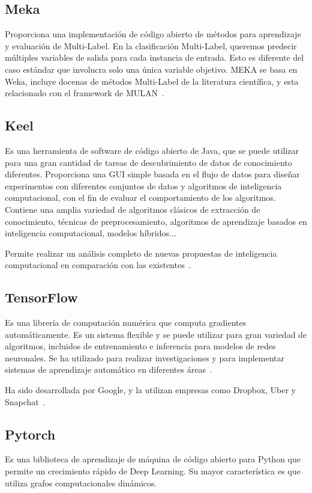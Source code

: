 \subsection{Meka}
Proporciona una implementación de código abierto de métodos para aprendizaje y evaluación de Multi-Label. En la clasificación Multi-Label, queremos predecir múltiples variables de salida para cada instancia de entrada. Esto es diferente del caso estándar que involucra solo una única variable objetivo. MEKA se basa en Weka, incluye docenas de métodos Multi-Label de la literatura científica, y esta relacionado con el framework de MULAN~\cite{meka}.

\subsection{Keel}
Es una herramienta de software de código abierto de Java, que se puede utilizar para una gran cantidad de tareas de descubrimiento de datos de conocimiento diferentes. Proporciona una GUI simple basada en el flujo de datos para diseñar experimentos con diferentes conjuntos de datos y algoritmos de inteligencia computacional, con el fin de evaluar el comportamiento de los algoritmos. Contiene una amplia variedad de algoritmos clásicos de extracción de conocimiento, técnicas de preprocesamiento, algoritmos de aprendizaje basados en inteligencia computacional, modelos híbridos...

Permite realizar un análisis completo de nuevas propuestas de inteligencia computacional en comparación con las existentes~\cite{keel}.

\subsection{TensorFlow}
Es una librería de computación numérica que computa gradientes automáticamente. Es un sistema flexible y se puede utilizar para gran variedad de algoritmos, incluidos de entrenamiento e inferencia para modelos de redes neuronales. Se ha utilizado para realizar investigaciones y para implementar sistemas de aprendizaje automático en diferentes áreas~\cite{tensorflow}.

Ha sido desarrollada por Google, y la utilizan empresas como Dropbox, Uber y Snapchat~\cite{libraries}.

\subsection{Pytorch}
Es una biblioteca de aprendizaje de máquina de código abierto para Python que permite un crecimiento rápido de Deep Learning. Su mayor característica es que utiliza grafos computacionales dinámicos.

